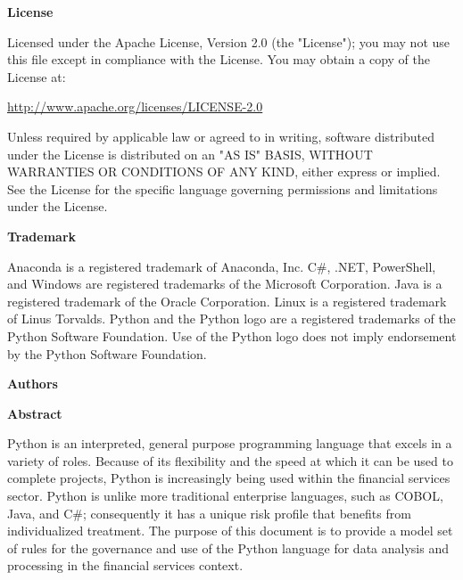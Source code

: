 \thispagestyle{empty}

\COPYRIGHT

\textbf{License}

Licensed under the Apache License, Version 2.0 (the "License"); you may not use this file except in compliance with the License. You may obtain a copy of the License at:

\url{http://www.apache.org/licenses/LICENSE-2.0}

Unless required by applicable law or agreed to in writing, software distributed under the License is distributed on an "AS IS" BASIS, WITHOUT WARRANTIES OR CONDITIONS OF ANY KIND, either express or implied. See the License for the specific language governing permissions and limitations under the License.

\textbf{Trademark}

Anaconda is a registered trademark of Anaconda, Inc. C\#, .NET, PowerShell, and Windows are registered trademarks of the Microsoft Corporation. Java is a registered trademark of the Oracle Corporation. Linux is a registered trademark of Linus Torvalds. Python and the Python logo are a registered trademarks of the Python Software Foundation. Use of the Python logo does not imply endorsement by the Python Software Foundation.

\textbf{Authors}

\AUTHORS

\textbf{Abstract}

Python is an interpreted, general purpose programming language that excels in a variety of roles. Because of its flexibility and the speed at which it can be used to complete projects, Python is increasingly being used within the financial services sector. Python is unlike more traditional enterprise languages, such as COBOL, Java, and C\#; consequently it has a unique risk profile that benefits from individualized treatment. The purpose of this document is to provide a model set of rules for the governance and use of the Python language for data analysis and processing in the financial services context.
